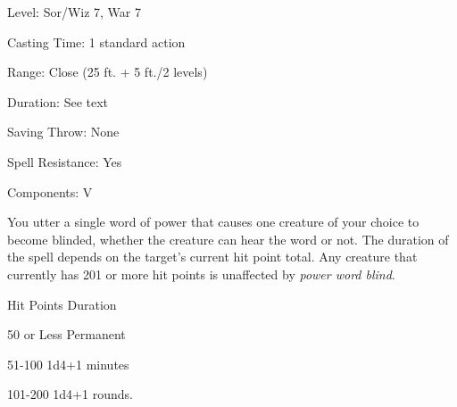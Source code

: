 
\begin{description*}
\item[Level:] Sor/Wiz 7, War 7
\item[Casting Time:] 1 standard action
\item[Range:] Close (25 ft. + 5 ft./2 levels)
\item[Duration:] See text
\item[Saving Throw:] None
\item[Spell Resistance:] Yes
\item[Components:] V
\end{description*}

You utter a single word of power that causes one creature of your choice to become
blinded, whether the creature can hear the word or not. The duration of the spell
depends on the target's current hit point total. Any creature that currently has
201 or more hit points is unaffected by \textit{power word blind}.
\begin{description*}
\item[Hit Points] Duration
\item[50 or Less] Permanent
\item[51-100] 1d4+1 minutes
\item[101-200] 1d4+1 rounds.
\end{description*}